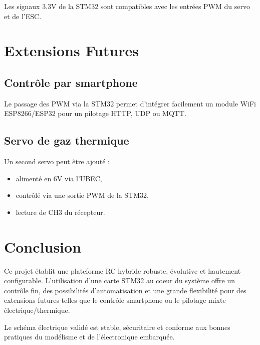 \documentclass[12pt,a4paper,french]{report}
\begin{document}
Les signaux 3.3V de la STM32 sont compatibles avec les entrées PWM du servo et de l'ESC.


\chapter{Extensions Futures}

\section{Contrôle par smartphone}
Le passage des PWM via la STM32 permet d'intégrer facilement un module WiFi ESP8266/ESP32 pour un pilotage HTTP, UDP ou MQTT.

\section{Servo de gaz thermique}
Un second servo peut être ajouté :
\begin{itemize}
    \item alimenté en 6V via l'UBEC,
    \item contrôlé via une sortie PWM de la STM32,
    \item lecture de CH3 du récepteur.
\end{itemize}


\chapter{Conclusion}

Ce projet établit une plateforme RC hybride robuste, évolutive et hautement configurable. L'utilisation d'une carte STM32 au coeur du système offre un contrôle fin, des possibilités d'automatisation et une grande flexibilité pour des extensions futures telles que le contrôle smartphone ou le pilotage mixte électrique/thermique.

Le schéma électrique validé est stable, sécuritaire et conforme aux bonnes pratiques du modélisme et de l'électronique embarquée.
\end{document}
